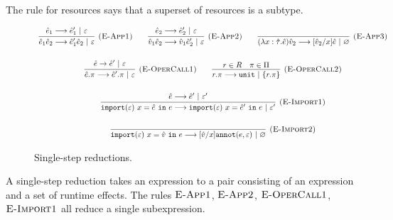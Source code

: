 The rule for resources says that a superset of resources is a subtype.













\begin{figure}[h]

\noindent
{}

\[
\begin{array}{c}

\infer[\textsc{(E-App1)}]
	{\hat e_1 \hat e_2 \longrightarrow \hat e_1' \hat e_2~|~\varepsilon}
	{\hat e_1 \longrightarrow \hat e_1'~|~\varepsilon}
	~~~~~~
\infer[\textsc{(E-App2)}]
	{\hat v_1 \hat e_2 \longrightarrow \hat v_1 \hat e_2'~|~\varepsilon} 
	{\hat e_2 \longrightarrow \hat e_2'~|~\varepsilon}
~~~~~~
\infer[\textsc{(E-App3)}]
	{ (\lambda x: \hat \tau.\hat e) \hat v_2 \longrightarrow [\hat v_2/x]\hat e~|~\varnothing }
	{}\\[4ex]
	
\infer[\textsc{(E-OperCall1)}]
	{\hat e.\pi \longrightarrow \hat e'.\pi~|~\varepsilon }
	{\hat e \rightarrow \hat e'~|~\varepsilon}
		
	~~~~~~
	
\infer[\textsc{(E-OperCall2)}]
	{r.\pi \longrightarrow \kwa{unit}~|~\{ r.\pi \} }
	{r \in R & \pi \in \Pi}
	 \\[4ex]
	 
\infer[\textsc{(E-Import1)}]
	{\kwa{import}(\varepsilon)~x = \hat e~\kw{in} e \longrightarrow \kwa{import}(\varepsilon)~x = \hat e'~\kw{in} e~|~\varepsilon'}
	{\hat e \longrightarrow \hat e'~|~\varepsilon'}\\[4ex]

\infer[\textsc{(E-Import2)}]
	{\kwa{import}(\varepsilon)~x = \hat v~\kw{in} e \longrightarrow [\hat v/x]\kwa{annot}(e, \varepsilon)~|~\varnothing}
	{}

\end{array}
\]


\vspace{-7pt}
\caption{Single-step reductions.}
\label{This is the label.}
\end{figure}

\noindent
A single-step reduction takes an expression to a pair consisting of an expression and a set of runtime effects. The rules $\textsc{E-App1}$, $\textsc{E-App2}$, $\textsc{E-OperCall1}$, $\textsc{E-Import1}$ all reduce a single subexpression.

